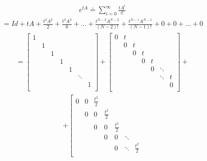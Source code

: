 \documentclass[letterpaper,10pt,english]{jupyterBook}
\begin{document}
\begin{equation*}
\begin{split}
    e^{tA} \doteq \sum_{i=0}^{\infty} \frac{tA^i}{i!}
\end{split}
\end{equation*}\begin{equation*}
\begin{split}
    = Id + tA + \frac{t^2 A^2}{2} + \frac{t^3 A^3}{6} + \dotsc + \frac{t^{N-2} A^{N-2}}{(N-2)!} + \frac{t^{N-1} A^{N-1}}{(N-1)!} + 0 + 0 + \dotsc + 0
\end{split}
\end{equation*}\begin{equation*}
\begin{split}
    = \left[ {\begin{array}{ccccccc}
    1 &  &  &  &  &  & \\
     & 1 &  &  &  &  &\\
     &  & 1 &  &  &  &\\
     &  &  & 1 &  &  &\\
     &  &  &  & 1 &  &\\
     &  &  &  &  & \ddots &\\
     &  &  &  &  &  & 1 \\
\end{array} } \right] + \left[ {\begin{array}{ccccccc}
    0 & t &  &  &  &  & \\
     & 0 & t &  &  &  &\\
     &  & 0 & t &  &  &\\
     &  &  & 0 & t &  &\\
     &  &  &  & 0 & \ddots &  \\
     &  &  &  &  & \ddots & t \\
     &  &  &  &  &  & 0 \\
\end{array} } \right] + 
\end{split}
\end{equation*}\begin{equation*}
\begin{split}
+ \left[ {\begin{array}{ccccccc}
    0 & 0 & \frac{t^2}{2} &  &  &  & \\
     & 0 & 0 & \frac{t^2}{2} &  &  &\\
     &  & 0 & 0 & \frac{t^2}{2} &  &\\
     &  &  & 0 & 0 & \ddots &\\
     &  &  &  & 0 & \ddots & \frac{t^2}{2} \\

\end{array}}
\end{split}
\end{equation*}
\end{document}
